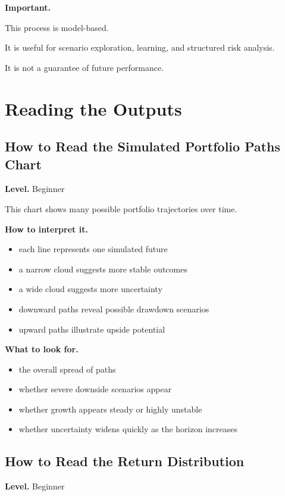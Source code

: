 \documentclass[11pt]{report}
\begin{document}
\begin{callout}
\textbf{Important.}

This process is model-based.

It is useful for scenario exploration, learning, and structured risk analysis.

It is not a guarantee of future performance.
\end{callout}

\chapter{Reading the Outputs}

\section{How to Read the Simulated Portfolio Paths Chart}
\begin{callout}
\textbf{Level.} Beginner
\end{callout}

This chart shows many possible portfolio trajectories over time.

\textbf{How to interpret it.}

\begin{itemize}
\item each line represents one simulated future
\item a narrow cloud suggests more stable outcomes
\item a wide cloud suggests more uncertainty
\item downward paths reveal possible drawdown scenarios
\item upward paths illustrate upside potential
\end{itemize}

\textbf{What to look for.}

\begin{itemize}
\item the overall spread of paths
\item whether severe downside scenarios appear
\item whether growth appears steady or highly unstable
\item whether uncertainty widens quickly as the horizon increases
\end{itemize}

\section{How to Read the Return Distribution}
\begin{callout}
\textbf{Level.} Beginner
\end{callout}
\end{document}

